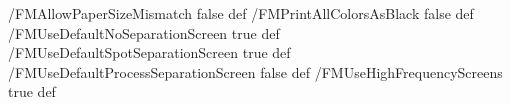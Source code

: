 %
%
/FMAllowPaperSizeMismatch            false def
%
/FMPrintAllColorsAsBlack             false def
%
/FMUseDefaultNoSeparationScreen      true  def
/FMUseDefaultSpotSeparationScreen    true  def
/FMUseDefaultProcessSeparationScreen false def
%
/FMUseHighFrequencyScreens true def
%
